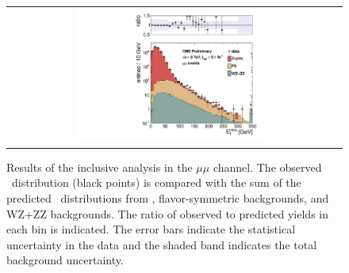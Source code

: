 \clearpage

\begin{figure}[!h]
\begin{center}
\begin{tabular}{cc}
\includegraphics[width=0.6\textwidth]{plots/met_2.pdf}
\end{tabular}
\caption{Results of the inclusive analysis in the $\mu\mu$ channel. The observed \MET\ distribution (black points) is compared with the sum of the predicted \MET\
distributions from \zjets, flavor-symmetric backgrounds, and WZ+ZZ backgrounds. The ratio of observed to predicted yields in each bin is
indicated. The error bars indicate the statistical uncertainty in the data and the shaded band indicates the total background uncertainty.
\label{fig:results_incl_mm}
}
\end{center}
\end{figure}

